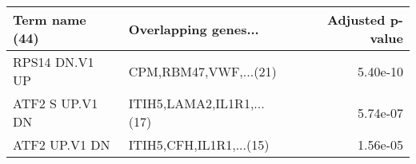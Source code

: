 \begin{tabular}{llr}
\toprule
 Term name (44) &      Overlapping genes... &  Adjusted p-value \\
\midrule
 RPS14 DN.V1 UP &     CPM,RBM47,VWF,...(21) &          5.40e-10 \\
ATF2 S UP.V1 DN & ITIH5,LAMA2,IL1R1,...(17) &          5.74e-07 \\
  ATF2 UP.V1 DN &   ITIH5,CFH,IL1R1,...(15) &          1.56e-05 \\
\bottomrule
\end{tabular}
